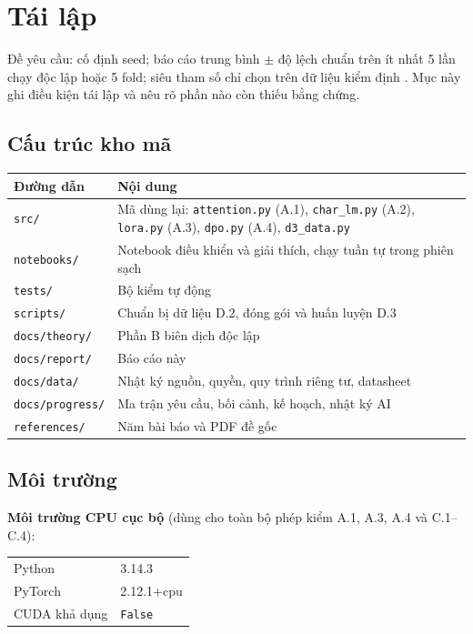 \section{Tái lập}
\label{sec:tai-lap}

Đề yêu cầu: cố định seed; báo cáo trung bình $\pm$ độ lệch chuẩn trên ít nhất 5 lần
chạy độc lập hoặc 5 fold; siêu tham số chỉ chọn trên dữ liệu kiểm định
\cite[tr.~2, mục II]{de}. Mục này ghi điều kiện tái lập và nêu rõ phần nào còn
thiếu bằng chứng.

\subsection{Cấu trúc kho mã}

\begin{center}
\begin{tabular}{lp{}}
\toprule
\textbf{Đường dẫn} & \textbf{Nội dung}\\
\midrule
\texttt{src/} & Mã dùng lại: \texttt{attention.py} (A.1), \texttt{char\_lm.py}
(A.2), \texttt{lora.py} (A.3), \texttt{dpo.py} (A.4), \texttt{d3\_data.py}\\
\texttt{notebooks/} & Notebook điều khiển và giải thích, chạy tuần tự trong phiên
sạch\\
\texttt{tests/} & Bộ kiểm tự động\\
\texttt{scripts/} & Chuẩn bị dữ liệu D.2, đóng gói và huấn luyện D.3\\
\texttt{docs/theory/} & Phần B biên dịch độc lập\\
\texttt{docs/report/} & Báo cáo này\\
\texttt{docs/data/} & Nhật ký nguồn, quyền, quy trình riêng tư, datasheet\\
\texttt{docs/progress/} & Ma trận yêu cầu, bối cảnh, kế hoạch, nhật ký AI\\
\texttt{references/} & Năm bài báo và PDF đề gốc\\
\bottomrule
\end{tabular}
\end{center}

\subsection{Môi trường}

\textbf{Môi trường CPU cục bộ} (dùng cho toàn bộ phép kiểm A.1, A.3, A.4 và C.1--C.4):

\begin{center}
\begin{tabular}{ll}
\toprule
Python & 3.14.3\\
PyTorch & 2.12.1+cpu\\
CUDA khả dụng & \texttt{False}\\
\bottomrule
\end{tabular}
\end{center}

